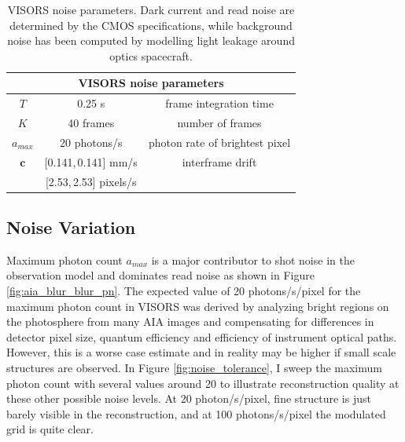 \documentclass[tocnosub,noragright,centerchapter,12pt]{uiucecethesis09}
\begin{document}
\begin{table}
  \begin{center}
    \begin{tabular}{|c|c|c|}
      \hline
      \multicolumn{3}{|c|}{VISORS noise parameters} \\
      \hline
      $T$ & 0.25 s  & frame integration time \\
      $K$ & 40 frames & number of frames \\
      $a_{max}$ & 20 photons/s  & photon rate of brightest pixel \\
      $\bm{c}$ & [0.141,\,0.141] mm/s & interframe drift \\
      & [2.53,\,2.53] pixels/s & \\
      \hline
    \end{tabular}
    \caption{VISORS noise parameters.  Dark current and read noise are determined by the CMOS specifications, while background noise has been computed by modelling light leakage around optics spacecraft.}
    \label{tab:recon_params}
  \end{center}
\end{table}


\subsection{Noise Variation}

Maximum photon count $a_{max}$ is a major contributor to shot noise in the observation model and dominates read noise as shown in Figure \ref{fig:aia_blur_blur_pn}.
The expected value of 20 photons/s/pixel for the maximum photon count in VISORS was derived by analyzing bright regions on the photosphere from many AIA images and compensating for differences in detector pixel size, quantum efficiency and efficiency of instrument optical paths.  However, this is a worse case estimate and in reality may be higher if small scale structures are observed.  In Figure \ref{fig:noise_tolerance}, I sweep the maximum photon count with several values around 20 to illustrate reconstruction quality at these other possible noise levels.  At 20 photon/s/pixel, fine structure is just barely visible in the reconstruction, and at 100 photons/s/pixel the modulated grid is quite clear.
\end{document}
